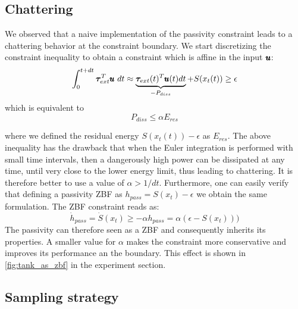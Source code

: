 \subsection{Chattering}
We observed that a naive implementation of the passivity constraint leads to a chattering behavior at the constraint boundary. We start discretizing the constraint inequality to obtain a constraint which is affine in the input $\pmb{u}$:
\begin{equation*}
    \int_{0}^{t + dt} \boldsymbol{\tau}_{ext}^T \pmb{u} \ dt \approx \underbrace{\boldsymbol{\tau}_{ext}(t)^T \pmb{u}(t) dt}_{-P_{diss}} + S(x_t(t)) \geq \epsilon
\end{equation*}
which is equivalent to 
\begin{equation}
    P_{diss} \leq \alpha E_{res}
\end{equation}

where we defined the residual energy $S(x_t(t))-\epsilon$ as $E_{res}$. The above inequality has the drawback that when the Euler integration is performed with small time intervals, then a dangerously high power can be dissipated at any time, until very close to the lower energy limit, thus leading to chattering. It is therefore better to use a value of $\alpha > 1/dt$. Furthermore, one can easily verify that defining a passivity ZBF as $h_{pass} = S(x_t) - \epsilon$ we obtain the same formulation. The ZBF constraint reads as:
\begin{equation*}
    \dot{h}_{pass} = \dot{S}(x_t) \geq -\alpha h_{pass}
     =\alpha (\epsilon - S(x_t)))
\end{equation*}
The passivity can therefore seen as a ZBF and consequently inherits its properties. A smaller value for $\alpha$ makes the constraint more conservative and improves its performance an the boundary. This effect is shown in \fig \ref{fig:tank_as_zbf} in the experiment section.

\subsection{Sampling strategy}

